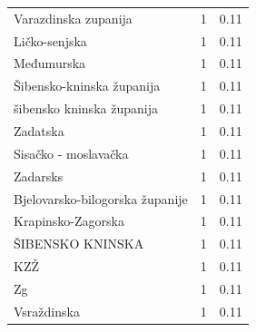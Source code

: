 \begin{tabular}{lrr}
Varazdinska zupanija & 1 & 0.11 \\
Ličko-senjska & 1 & 0.11 \\
Međumurska & 1 & 0.11 \\
Šibensko-kninska županija & 1 & 0.11 \\
šibensko kninska županija & 1 & 0.11 \\
Zadatska & 1 & 0.11 \\
Sisačko - moslavačka & 1 & 0.11 \\
Zadarsks & 1 & 0.11 \\
Bjelovarsko-bilogorska županije & 1 & 0.11 \\
Krapinsko-Zagorska & 1 & 0.11 \\
ŠIBENSKO KNINSKA & 1 & 0.11 \\
KZŽ & 1 & 0.11 \\
Zg & 1 & 0.11 \\
Vsraždinska & 1 & 0.11 \\
\bottomrule
\end{tabular}
